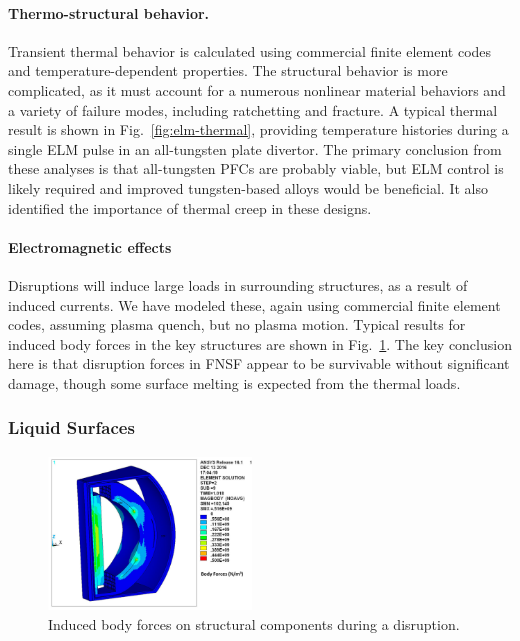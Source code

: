 \paragraph{Thermo-structural behavior.} Transient thermal behavior is
calculated using commercial finite element codes and temperature-dependent
properties. The structural behavior is more complicated, as it must account
for a numerous nonlinear material behaviors and a variety of failure modes,
including ratchetting and fracture. A typical thermal result is shown in
Fig.\ \ref{fig:elm-thermal}, providing temperature histories during a single
\gls{ELM} pulse in an all-tungsten plate divertor. The primary conclusion from
these analyses is that all-tungsten \glspl{PFC} are probably viable, but
\gls{ELM} control is likely required and improved tungsten-based alloys would
be beneficial. It also identified the importance of thermal creep in these
designs.

\paragraph{Electromagnetic effects} Disruptions will induce large loads in
surrounding structures, as a result of induced currents. We have modeled
these, again using commercial finite element codes, assuming plasma quench,
but no plasma motion. Typical results for induced body forces in the key
structures are shown in Fig.\ \ref{fig:disrupt-em}. The key conclusion here is
that disruption forces in FNSF appear to be survivable without significant
damage, though some surface melting is expected from the thermal
loads.

\subsubsection{Liquid Surfaces}

\begin{figure}
\centering
\includegraphics[width=0.48\textwidth]{imgs/disrupt-em.png}
\caption{\label{fig:disrupt-em}Induced body forces on structural components during a disruption.}
\end{figure}

